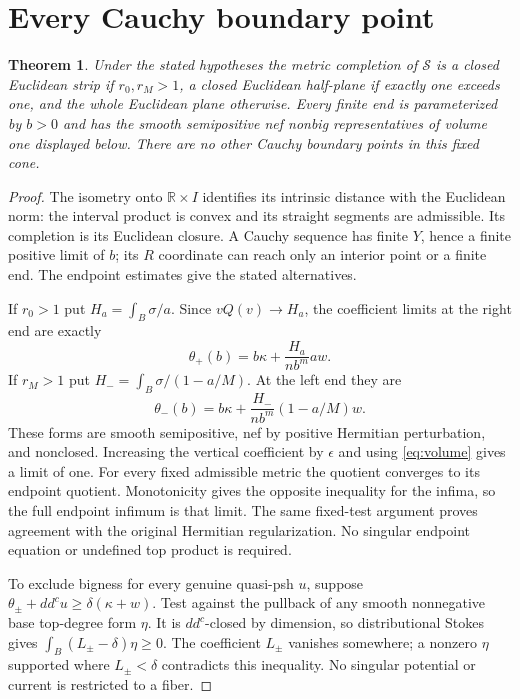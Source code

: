 \documentclass[11pt]{article}
\newcommand{\ddc}{dd^c}
\newtheorem{theorem}{Theorem}
\theoremstyle{remark}\newtheorem{remark}[theorem]{Remark}
\begin{document}
\section{Every Cauchy boundary point}
\begin{theorem}\label{th:completion}
Under the stated hypotheses the metric completion of $\mathcal S$ is
a closed Euclidean strip if $r_0,r_M>1$, a closed Euclidean half-plane
if exactly one exceeds one, and the whole Euclidean plane otherwise.
Every finite end is parameterized by $b>0$ and has the smooth
semipositive nef nonbig representatives of volume one displayed below.
There are no other Cauchy boundary points in this fixed cone.
\end{theorem}
\begin{proof}
The isometry onto $\mathbb R\times I$ identifies its intrinsic distance
with the Euclidean norm: the interval product is convex and its straight
segments are admissible. Its completion is its Euclidean closure. A
Cauchy sequence has finite $Y$, hence a finite positive limit of $b$;
its $R$ coordinate can reach only an interior point or a finite end.
The endpoint estimates give the stated alternatives.

If $r_0>1$ put $H_a=\int_B\sigma/a$. Since $vQ(v)\to H_a$, the
coefficient limits at the right end are exactly
\[
 \theta_+(b)=b\kappa+\frac{H_a}{nb^m}a w.
\]
If $r_M>1$ put $H_-=\int_B\sigma/(1-a/M)$. At the left end they are
\[
 \theta_-(b)=b\kappa+\frac{H_-}{nb^m}(1-a/M)w.
\]
These forms are smooth semipositive, nef by positive Hermitian
perturbation, and nonclosed. Increasing the vertical coefficient by
$\epsilon$ and using \eqref{eq:volume} gives a limit of one. For every
fixed admissible metric the quotient converges to its endpoint quotient.
Monotonicity gives the opposite inequality for the infima, so the full
endpoint infimum is that limit. The same fixed-test argument proves
agreement with the original Hermitian regularization. No singular
endpoint equation or undefined top product is required.

To exclude bigness for every genuine quasi-psh $u$, suppose
$\theta_\pm+\ddc u\geq\delta(\kappa+w)$. Test against the pullback of
any smooth nonnegative base top-degree form $\eta$. It is $\ddc$-closed
by dimension, so distributional Stokes gives
$\int_B(L_\pm-\delta)\eta\geq0$. The coefficient $L_\pm$ vanishes
somewhere; a nonzero $\eta$ supported where $L_\pm<\delta$ contradicts
this inequality. No singular potential or current is restricted to a fiber.
\end{proof}
\end{document}
